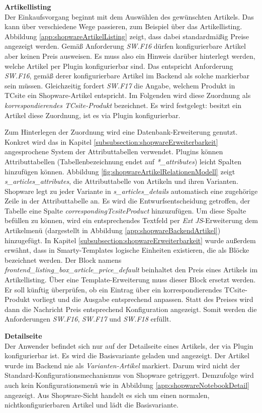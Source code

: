 \documentclass[11pt, a4paper, titlepage, listof=totoc, bibliography=totoc, index=totoc, twoside, openright, headings=normal]{scrreprt}
\begin{document}
\textbf{Artikellisting}\\
Der Einkaufsvorgang beginnt mit dem Auswählen des gewünschten Artikels. Das kann über verschiedene Wege passieren, zum Beispiel über das Artikellisting. Abbildung \ref{app:shopwareArtikelListing} zeigt, dass dabei standardmäßig Preise angezeigt werden. Gemäß Anforderung \emph{SW.F16} dürfen konfigurierbare Artikel aber keinen Preis ausweisen. Es muss also ein Hinweis darüber hinterlegt werden, welche Artikel per Plugin konfigurierbar sind. Das entspricht Anforderung \emph{SW.F16}, gemäß derer konfigurierbare Artikel im Backend als solche markierbar sein müssen. Gleichzeitig fordert \emph{SW.F17} die Angabe, welchem Produkt in TCsite ein Shopware-Artikel entspricht. Im Folgenden wird diese Zuordnung als \emph{korrespondierendes TCsite-Produkt} bezeichnet. Es wird festgelegt: besitzt ein Artikel diese Zuordnung, ist es via Plugin konfigurierbar.

Zum Hinterlegen der Zuordnung wird eine Datenbank-Erweiterung genutzt. Konkret wird das in Kapitel \ref{subsubsection:shopwareErweiterbarkeit} angesprochene System der Attributtabellen verwendet. Plugins können Attributtabellen (Tabellenbezeichnung endet auf \emph{*\_attributes}) leicht Spalten hinzufügen können. Abbildung \ref{fig:shopwareArtikelRelationenModell} zeigt \emph{s\_articles\_attributes}, die Attributtabelle von Artikeln und ihren Varianten. Shopware legt zu jeder Variante in \emph{s\_articles\_details} automatisch eine zugehörige Zeile in der Attributtabelle an. Es wird die Entwurfsentscheidung getroffen, der Tabelle eine Spalte \emph{correspondingTcsiteProduct} hinzuzufügen. Um diese Spalte befüllen zu können, wird ein entsprechendes Textfeld per \emph{Ext JS}-Erweiterung dem Artikelmenü (dargestellt in Abbildung \ref{app:shopwareBackendArtikel}) hinzugefügt. In Kapitel \ref{subsubsection:shopwareErweiterbarkeit} wurde außerdem erwähnt, dass in Smarty-Templates logische Einheiten existieren, die als Blöcke bezeichnet werden. Der Block namens \emph{frontend\_listing\_box\_article\_price\_default} beinhaltet den Preis eines Artikels im Artikellisting.  Über eine Template-Erweiterung muss dieser Block ersetzt werden. Er soll künftig überprüfen, ob ein Eintrag über ein korrespondierendes TCsite-Produkt vorliegt und die Ausgabe entsprechend anpassen. Statt des Preises wird dann die Nachricht  \glqq Preis entsprechend Konfiguration\grqq{} angezeigt. Somit werden die Anforderungen \emph{SW.F16}, \emph{SW.F17} und \emph{SW.F18} erfüllt.

\textbf{Detailseite}\\
Der Anwender befindet sich nur auf der Detailseite eines Artikels, der via Plugin konfigurierbar ist. Es wird die Basisvariante geladen und angezeigt. Der Artikel wurde im Backend nie als \emph{Varianten-Artikel} markiert. Darum wird nicht der Standard-Konfigurationsmechanismus von Shopware getriggert. Demzufolge wird  auch kein Konfigurationsmenü wie in Abbildung \ref{app:shopwareNotebookDetail} angezeigt. Aus Shopware-Sicht handelt es sich um einen normalen, nichtkonfigurierbaren Artikel und lädt die Basisvariante.
\end{document}
